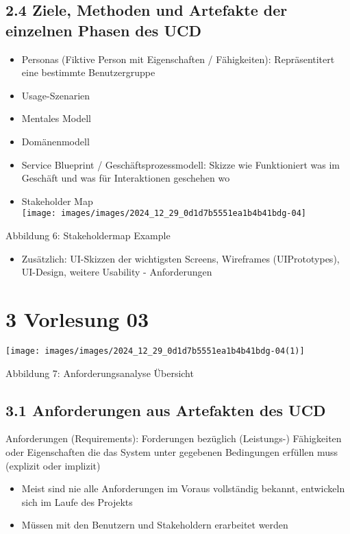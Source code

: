 \subsection*{2.4 Ziele, Methoden und Artefakte der einzelnen Phasen des UCD}
\begin{itemize}
  \item Personas (Fiktive Person mit Eigenschaften / Fähigkeiten): Repräsentitert eine bestimmte Benutzergruppe
  \item Usage-Szenarien
  \item Mentales Modell
  \item Domänenmodell
  \item Service Blueprint / Geschäftsprozessmodell: Skizze wie Funktioniert was im Geschäft und was für Interaktionen geschehen wo
  \item Stakeholder Map\\
\texttt{[image: images/images/2024\_12\_29\_0d1d7b5551ea1b4b41bdg-04]}
\end{itemize}

Abbildung 6: Stakeholdermap Example

\begin{itemize}
  \item Zusätzlich: UI-Skizzen der wichtigsten Screens, Wireframes (UIPrototypes), UI-Design, weitere Usability - Anforderungen
\end{itemize}

\section*{3 Vorlesung 03}
\begin{center}
\texttt{[image: images/images/2024\_12\_29\_0d1d7b5551ea1b4b41bdg-04(1)]}
\end{center}

Abbildung 7: Anforderungsanalyse Übersicht

\subsection*{3.1 Anforderungen aus Artefakten des UCD}
Anforderungen (Requirements): Forderungen bezüglich (Leistungs-) Fähigkeiten oder Eigenschaften die das System unter gegebenen Bedingungen erfüllen muss (explizit oder implizit)

\begin{itemize}
  \item Meist sind nie alle Anforderungen im Voraus vollständig bekannt, entwickeln sich im Laufe des Projekts
  \item Müssen mit den Benutzern und Stakeholdern erarbeitet werden
\end{itemize}

